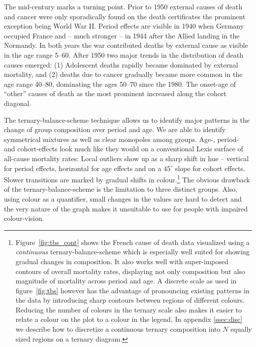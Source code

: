 \documentclass[parskip=half]{scrartcl}
\begin{document}
The mid-century marks a turning point. Prior to 1950 external causes of death and cancer were only sporadically found on the death certificates the prominent exception being World War II. Period effects are visible in 1940 when Germany occupied France and -- much stronger -- in 1944 after the Allied landing in the Normandy. In both years the war contributed deaths by external cause as visible in the age range 5--60. After 1950 two major trends in the distribution of death causes emerged:
  (1) Adolescent deaths rapidly became dominated by external mortality, and
  (2) deaths due to cancer gradually became more common in the age range 40--80, dominating the ages 50--70 since the 1980. The onset-age of \enquote{other} causes of death as the most prominent increased along the cohort diagonal.

The ternary-balance-scheme technique allows us to identify major patterns in the change of group composition over period and age. We are able to identify symmetrical mixtures as well as clear monopoles among groups. Age-, period- and cohort-effects look much like they would on a conventional Lexis surface of all-cause mortality rates: Local outliers show up as a sharp shift in hue -- vertical for period effects, horizontal for age effects and on a $45^{\circ}$ slope for cohort effects. Slower transitions are marked by gradual shifts in colour.\footnote{
  Figure~\ref{fig:tbs_cont} shows the French cause of death data visualized using a \emph{continuous} ternary-balance-scheme which is especially well suited for showing gradual changes in composition. It also works well with super-imposed contours of overall mortality rates, displaying not only composition but also magnitude of mortality across period and age. A discrete scale as used in figure~\ref{fig:tbs} however has the advantage of pronouncing existing patterns in the data by introducing sharp contours between regions of different colours. Reducing the number of colours in the ternary scale also makes it easier to relate a colour on the plot to a colour in the legend. In appendix \ref{ssec:disc} we describe how to discretize a continuous ternary composition into $N$ equally sized regions on a ternary diagram.
}
The obvious drawback of the ternary-balance-scheme is the limitation to three distinct groups. Also, using colour as a quantifier, small changes in the values are hard to detect and the very nature of the graph makes it unsuitable to use for people with impaired colour-vision.

\clearpage
\end{document}
